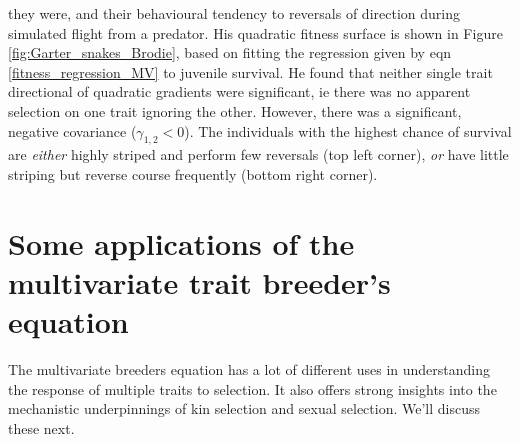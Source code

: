 they were, and their behavioural tendency to reversals of direction
during simulated flight from a predator. His quadratic fitness surface is shown in Figure
\ref{fig:Garter_snakes_Brodie}, based on fitting the
regression given by eqn \eqref{fitness_regression_MV} to juvenile
survival. He found that neither single trait directional of quadratic
gradients were significant, ie there was no apparent selection on one 
trait ignoring the other. However, there was a significant, negative
covariance ($\gamma_{1,2}<0$). The individuals with the highest chance of survival are
{\it either} highly striped and perform few reversals (top left
corner), {\it or} have little striping but reverse course frequently
(bottom right corner). 


\section{Some applications of the multivariate trait breeder's equation}

The multivariate breeders equation has a lot of different uses in
understanding the response of multiple traits to selection. It also
offers strong insights into the mechanistic underpinnings of kin selection and sexual selection. We'll discuss these next.

